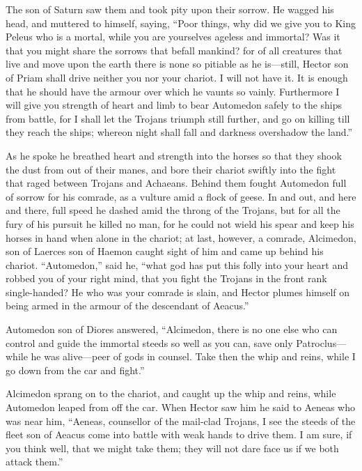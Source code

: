 The son of Saturn saw them and took pity upon their sorrow. He wagged his
head, and muttered to himself, saying, “Poor things, why did we give you
to King Peleus who is a mortal, while you are yourselves ageless and
immortal? Was it that you might share the sorrows that befall mankind? for
of all creatures that live and move upon the earth there is none so
pitiable as he is—still, Hector son of Priam shall drive neither you
nor your chariot. I will not have it. It is enough that he should have the
armour over which he vaunts so vainly. Furthermore I will give you
strength of heart and limb to bear Automedon safely to the ships from
battle, for I shall let the Trojans triumph still further, and go on
killing till they reach the ships; whereon night shall fall and darkness
overshadow the land.”

As he spoke he breathed heart and strength into the horses so that they
shook the dust from out of their manes, and bore their chariot swiftly
into the fight that raged between Trojans and Achaeans. Behind them fought
Automedon full of sorrow for his comrade, as a vulture amid a flock of
geese. In and out, and here and there, full speed he dashed amid the
throng of the Trojans, but for all the fury of his pursuit he killed no
man, for he could not wield his spear and keep his horses in hand when
alone in the chariot; at last, however, a comrade, Alcimedon, son of
Laerces son of Haemon caught sight of him and came up behind his chariot.
“Automedon,” said he, “what god has put this folly into your heart and
robbed you of your right mind, that you fight the Trojans in the front
rank single-handed? He who was your comrade is slain, and Hector plumes
himself on being armed in the armour of the descendant of Aeacus.”

Automedon son of Diores answered, “Alcimedon, there is no one else who can
control and guide the immortal steeds so well as you can, save only
Patroclus—while he was alive—peer of gods in counsel. Take
then the whip and reins, while I go down from the car and fight.”

Alcimedon sprang on to the chariot, and caught up the whip and reins,
while Automedon leaped from off the car. When Hector saw him he said to
Aeneas who was near him, “Aeneas, counsellor of the mail-clad Trojans, I
see the steeds of the fleet son of Aeacus come into battle with weak hands
to drive them. I am sure, if you think well, that we might take them; they
will not dare face us if we both attack them.”

